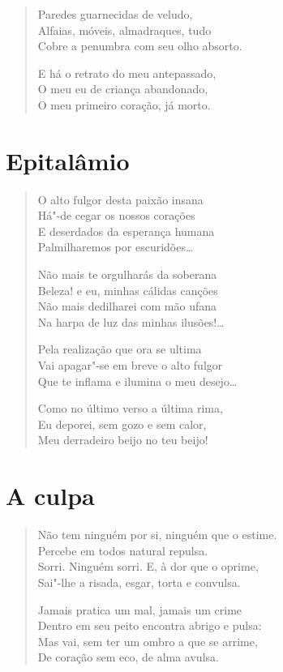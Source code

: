 {\begin{verse}
Paredes guarnecidas de veludo,\\
Alfaias, móveis, almadraques, tudo\\
Cobre a penumbra com seu olho absorto.

E há o retrato do meu antepassado,\\
O meu eu de criança abandonado,\\
O meu primeiro coração, já morto.
\end{verse}

\chapter{Epitalâmio}

\begin{verse}
O alto fulgor desta paixão insana\\
Há"-de cegar os nossos corações\\
E deserdados da esperança humana\\
Palmilharemos por escuridões\ldots{}

Não mais te orgulharás da soberana\\
Beleza! e eu, minhas cálidas canções\\
Não mais dedilharei com mão ufana\\
Na harpa de luz das minhas ilusões!\ldots{}

Pela realização que ora se ultima\\
Vai apagar"-se em breve o alto fulgor\\
Que te inflama e ilumina o meu desejo\ldots{}

Como no último verso a última rima,\\
Eu deporei, sem gozo e sem calor,\\
Meu derradeiro beijo no teu beijo!
\end{verse}

\chapter{A culpa}

\begin{verse}
Não tem ninguém por si, ninguém que o estime.\\
Percebe em todos natural repulsa.\\
Sorri. Ninguém sorri. E, à dor que o oprime,\\
Sai"-lhe a risada, esgar, torta e convulsa.

Jamais pratica um mal, jamais um crime\\
Dentro em seu peito encontra abrigo e pulsa:\\
Mas vai, sem ter um ombro a que se arrime,\\
De coração sem eco, de alma avulsa.


\end{verse}}
